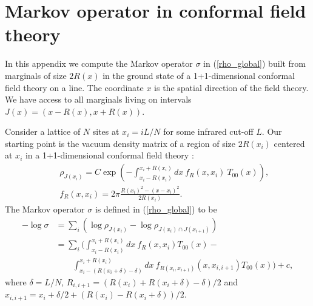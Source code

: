 \documentclass[12pt]{article}
\newcommand{\rb}{\right)}
\newcommand{\lb}{\left(}
\def\bea{\begin{eqnarray}}
\def\eea{\end{eqnarray}}
\newcommand{\nn}{\nonumber}
\begin{document}
\section{Markov operator in conformal field theory} \label{cft-calc}
In this appendix we compute the Markov operator $\sigma$ in (\ref{rho_global}) built from marginals of size $2R(x)$ in the ground state of a 1+1-dimensional conformal field theory on a line. 
The coordinate $x$ is the spatial direction of the field theory.  We have access to all marginals living on intervals $J(x)=(x-R(x),x+R(x))$.

Consider a lattice of $N$ sites at $x_i=i L/N$ for some infrared cut-off $L$. Our starting point is the vacuum density matrix of a region of size $2R(x_i)$ centered at $x_i$ in a 1+1-dimensional conformal field theory \cite{casini2011towards}:
\bea
&&\rho_{J(x_i)}=C\exp\lb -\int^{x_i+R(x_i)}_{x_i-R(x_i)} dx\:f_R(x,x_i)\:T_{00}(x)\rb,\nn\\
&&f_R(x,x_i)=2\pi \frac{R(x_i)^2-(x-x_i)^2}{2R(x_i)}.
\eea
The Markov operator $\sigma$ is defined in (\ref{rho_global}) to be
\begin{align}
-\log\sigma &=\sum_i\lb \log\rho_{J(x_i)}-\log\rho_{J(x_i)\cap J(x_{i+1})}\rb\nn\\
&=\sum_i\biggl(\int_{x_i-R(x_i)}^{x_i+R(x_i)} dx\:f_R(x,x_i)T_{00}(x)-\nn\\
&\qquad \int_{x_i-(R(x_i+\delta)-\delta)}^{x_i+R(x_i)}dx\:f_{R(x_i,x_{i+1})}(x,x_{i,i+1})T_{00}(x)\biggr)+c,\nn
\end{align}
where $\delta=L/N$, $R_{i,i+1}=(R(x_i)+R(x_i+\delta)-\delta)/2$ and $x_{i,i+1}=x_i+\delta/2+(R(x_i)-R(x_i+\delta))/2$.
\end{document}
